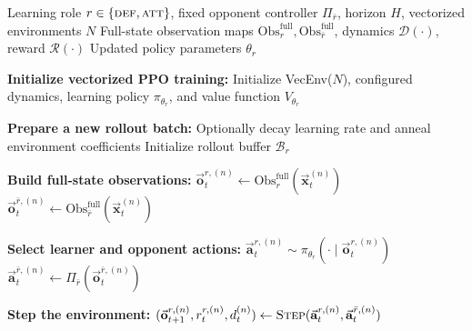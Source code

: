 \begin{algorithm}[H]
\caption{Single-Phase PPO Update with Full-State Observations}
\label{alg:ppo_full_obs}
\begin{algorithmic}[1]
\Require Learning role $r\in\{\textsc{def},\textsc{att}\}$, fixed opponent controller $\Pi_{\bar r}$, horizon $H$, vectorized environments $N$
\Require Full-state observation maps $\mathrm{Obs}^{\mathrm{full}}_r,\mathrm{Obs}^{\mathrm{full}}_{\bar r}$, dynamics $\mathcal{D}(\cdot)$, reward $\mathcal{R}(\cdot)$
\Ensure Updated policy parameters $\theta_r$

\State \textbf{Initialize vectorized PPO training:}
\State \hspace{1em} Initialize VecEnv($N$), configured dynamics, learning policy $\pi_{\theta_r}$, and value function $V_{\theta_r}$

  \State \textbf{Prepare a new rollout batch:}
  \State \hspace{1em} Optionally decay learning rate and anneal environment coefficients
  \State \hspace{1em} Initialize rollout buffer $\mathcal{B}_r$

    \State \textbf{Build full-state observations:}
    \State \hspace{1em} $\vec{\mathbf{o}}_t^{r,(n)} \leftarrow \mathrm{Obs}^{\mathrm{full}}_r(\vec{\mathbf{x}}_t^{(n)})$
    \State \hspace{1em} $\vec{\mathbf{o}}_t^{\bar r,(n)} \leftarrow \mathrm{Obs}^{\mathrm{full}}_{\bar r}(\vec{\mathbf{x}}_t^{(n)})$

    \State \textbf{Select learner and opponent actions:}
    \State \hspace{1em} $\vec{\mathbf{a}}_t^{r,(n)} \sim \pi_{\theta_r}(\cdot \mid \vec{\mathbf{o}}_t^{r,(n)})$
    \State \hspace{1em} $\vec{\mathbf{a}}_t^{\bar r,(n)} \leftarrow \Pi_{\bar r}(\vec{\mathbf{o}}_t^{\bar r,(n)})$

    \State \textbf{Step the environment:}
    \State \hspace{1em} $(\vec{\mathbf{o}}_{t+1}^{r,(n)}, r_t^{r,(n)}, d_t^{(n)}) \leftarrow \textsc{Step}(\vec{\mathbf{a}}_t^{r,(n)}, \vec{\mathbf{a}}_t^{\bar r,(n)})$


\end{algorithmic}
\end{algorithm}

